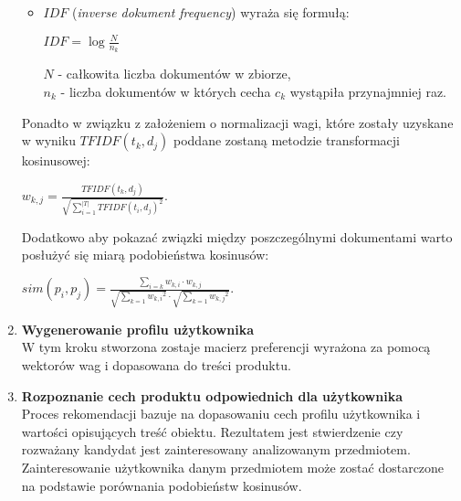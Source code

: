 \documentclass[12pt,a4paper]{report}
\begin{document}
\begin{enumerate}
\begin{itemize}
\item \begin{math}IDF \end{math} (\textit{inverse dokument frequency}) wyraża się formułą:
\begin{center}
\begin{math}IDF = \log \frac{N}{n_k} \end{math}
\end{center}
$N$ - całkowita liczba dokumentów w zbiorze,
\\$n_k$ - liczba dokumentów w których cecha $c_k$ wystąpiła przynajmniej raz.
\end{itemize}
Ponadto w związku z założeniem o normalizacji wagi, które zostały uzyskane w wyniku \begin{math}
TFIDF(t_k, d_j)
\end{math} poddane zostaną metodzie transformacji kosinusowej: 
\begin{center}
\begin{math}
w_{k,j} = \frac{TFIDF(t_k, d_j)}{\sqrt{\sum_{i=1}^{|T|}{TFIDF(t_i, d_j)}^2}}.
\end{math}
\end{center}
Dodatkowo aby pokazać związki między poszczególnymi dokumentami warto posłużyć się miarą podobieństwa kosinusów:
\begin{center}
\begin{math}
sim(p_i,p_j) = \frac{\sum_{i=k} w_{k,i}\cdot w_{k,j}}{\sqrt{\sum_{k=1}{w_{k,i}}^2} \cdot \sqrt{\sum_{k=1}{w_{k,j}}^2}}.
\end{math}
\end{center}


\item \textbf{Wygenerowanie profilu użytkownika}
\\W tym kroku stworzona zostaje macierz preferencji wyrażona za pomocą wektorów wag i dopasowana do treści produktu. 
\item \textbf{Rozpoznanie cech produktu odpowiednich dla użytkownika}
\\Proces rekomendacji bazuje na dopasowaniu cech profilu użytkownika i wartości opisujących treść obiektu. Rezultatem jest stwierdzenie czy rozważany kandydat jest zainteresowany analizowanym przedmiotem. Zainteresowanie użytkownika danym przedmiotem może zostać dostarczone na podstawie porównania podobieństw kosinusów.
\end{enumerate}
\end{document}
